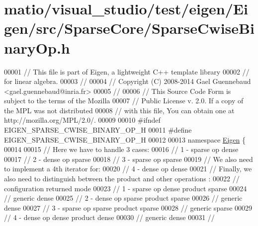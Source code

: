 \hypertarget{matio_2visual__studio_2test_2eigen_2_eigen_2src_2_sparse_core_2_sparse_cwise_binary_op_8h_source}{}\section{matio/visual\+\_\+studio/test/eigen/\+Eigen/src/\+Sparse\+Core/\+Sparse\+Cwise\+Binary\+Op.h}
\label{matio_2visual__studio_2test_2eigen_2_eigen_2src_2_sparse_core_2_sparse_cwise_binary_op_8h_source}

\begin{DoxyCode}
00001 \textcolor{comment}{// This file is part of Eigen, a lightweight C++ template library}
00002 \textcolor{comment}{// for linear algebra.}
00003 \textcolor{comment}{//}
00004 \textcolor{comment}{// Copyright (C) 2008-2014 Gael Guennebaud <gael.guennebaud@inria.fr>}
00005 \textcolor{comment}{//}
00006 \textcolor{comment}{// This Source Code Form is subject to the terms of the Mozilla}
00007 \textcolor{comment}{// Public License v. 2.0. If a copy of the MPL was not distributed}
00008 \textcolor{comment}{// with this file, You can obtain one at http://mozilla.org/MPL/2.0/.}
00009 
00010 \textcolor{preprocessor}{#ifndef EIGEN\_SPARSE\_CWISE\_BINARY\_OP\_H}
00011 \textcolor{preprocessor}{#define EIGEN\_SPARSE\_CWISE\_BINARY\_OP\_H}
00012 
00013 \textcolor{keyword}{namespace }\hyperlink{namespace_eigen}{Eigen} \{ 
00014 
00015 \textcolor{comment}{// Here we have to handle 3 cases:}
00016 \textcolor{comment}{//  1 - sparse op dense}
00017 \textcolor{comment}{//  2 - dense op sparse}
00018 \textcolor{comment}{//  3 - sparse op sparse}
00019 \textcolor{comment}{// We also need to implement a 4th iterator for:}
00020 \textcolor{comment}{//  4 - dense op dense}
00021 \textcolor{comment}{// Finally, we also need to distinguish between the product and other operations :}
00022 \textcolor{comment}{//                configuration      returned mode}
00023 \textcolor{comment}{//  1 - sparse op dense    product      sparse}
00024 \textcolor{comment}{//                         generic      dense}
00025 \textcolor{comment}{//  2 - dense op sparse    product      sparse}
00026 \textcolor{comment}{//                         generic      dense}
00027 \textcolor{comment}{//  3 - sparse op sparse   product      sparse}
00028 \textcolor{comment}{//                         generic      sparse}
00029 \textcolor{comment}{//  4 - dense op dense     product      dense}
00030 \textcolor{comment}{//                         generic      dense}
00031 \textcolor{comment}{//}

\end{DoxyCode}
